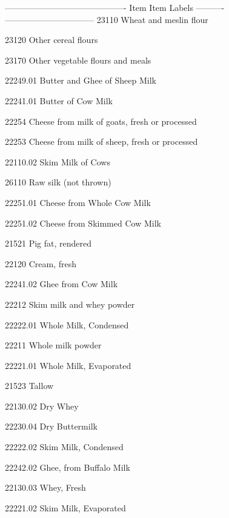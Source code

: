 \documentclass[nojss]{jss}
\begin{document}
\begin{appendices}

\begin{Schunk}
\begin{Soutput}
-------------------------------------------
   Item              Item Labels           
---------- --------------------------------
  23110         Wheat and meslin flour     

  23120          Other cereal flours       

  23170       Other vegetable flours and   
                        meals              

 22249.01   Butter and Ghee of Sheep Milk  

 22241.01         Butter of Cow Milk       

  22254       Cheese from milk of goats,   
                  fresh or processed       

  22253       Cheese from milk of sheep,   
                  fresh or processed       

 22110.02         Skim Milk of Cows        

  26110         Raw silk (not thrown)      

 22251.01     Cheese from Whole Cow Milk   

 22251.02    Cheese from Skimmed Cow Milk  

  21521           Pig fat, rendered        

  22120              Cream, fresh          

 22241.02         Ghee from Cow Milk       

  22212       Skim milk and whey powder    

 22222.01       Whole Milk, Condensed      

  22211           Whole milk powder        

 22221.01       Whole Milk, Evaporated     

  21523                 Tallow             

 22130.02              Dry Whey            

 22230.04           Dry Buttermilk         

 22222.02        Skim Milk, Condensed      

 22242.02      Ghee, from Buffalo Milk     

 22130.03            Whey, Fresh           

 22221.02       Skim Milk, Evaporated      


\end{Soutput}
\end{Schunk}
\end{appendices}
\end{document}
